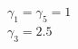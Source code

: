 \documentclass[preview]{standalone}
\begin{document}
\begin{center}
$\gamma_1 = \gamma_5 = 1$\\$\gamma_3 = 2.5$
\end{center}
\end{document}

